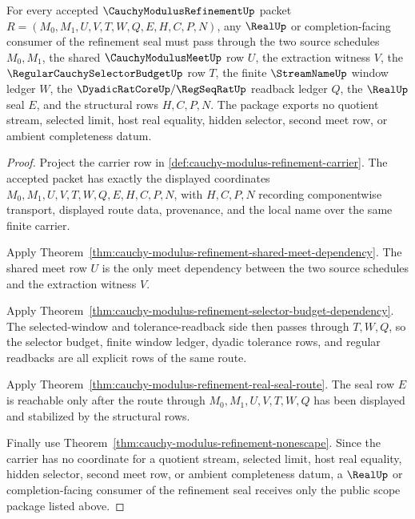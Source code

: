 \begin{theorem}
\label{thm:cauchy-modulus-refinement-real-seal-scope-package}
For every accepted $\CauchyModulusRefinementUp$ packet $R=(M_0,M_1,U,V,T,W,Q,E,H,C,P,N)$, any $\RealUp$ or completion-facing consumer of the refinement seal must pass through the two source schedules $M_0,M_1$, the shared $\CauchyModulusMeetUp$ row $U$, the extraction witness $V$, the $\RegularCauchySelectorBudgetUp$ row $T$, the finite $\StreamNameUp$ window ledger $W$, the $\DyadicRatCoreUp/\RegSeqRatUp$ readback ledger $Q$, the $\RealUp$ seal $E$, and the structural rows $H,C,P,N$. The package exports no quotient stream, selected limit, host real equality, hidden selector, second meet row, or ambient completeness datum.
\end{theorem}
\begin{proof}
Project the carrier row in \autoref{def:cauchy-modulus-refinement-carrier}. The accepted packet has exactly the displayed coordinates $M_0,M_1,U,V,T,W,Q,E,H,C,P,N$, with $H,C,P,N$ recording componentwise transport, displayed route data, provenance, and the local name over the same finite carrier.

Apply Theorem~\ref{thm:cauchy-modulus-refinement-shared-meet-dependency}. The shared meet row $U$ is the only meet dependency between the two source schedules and the extraction witness $V$.

Apply Theorem~\ref{thm:cauchy-modulus-refinement-selector-budget-dependency}. The selected-window and tolerance-readback side then passes through $T,W,Q$, so the selector budget, finite window ledger, dyadic tolerance rows, and regular readbacks are all explicit rows of the same route.

Apply Theorem~\ref{thm:cauchy-modulus-refinement-real-seal-route}. The seal row $E$ is reachable only after the route through $M_0,M_1,U,V,T,W,Q$ has been displayed and stabilized by the structural rows.

Finally use Theorem~\ref{thm:cauchy-modulus-refinement-nonescape}. Since the carrier has no coordinate for a quotient stream, selected limit, host real equality, hidden selector, second meet row, or ambient completeness datum, a $\RealUp$ or completion-facing consumer of the refinement seal receives only the public scope package listed above.
\end{proof}


